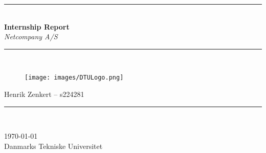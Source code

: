 \documentclass[../main.tex]{subfiles}
\begin{document}
\begin{titlepage}
	\centering
	\rule{\textwidth}{1mm}\\
	\vspace{0.1cm}
	\Huge{}\textbf{Internship Report}\\
	\LARGE{}\emph{Netcompany A/S}

	\vspace{-0.4cm}
	\rule{\textwidth}{1mm}\\
	\vspace{1.3 cm}

	\begin{figure}[H]
		\centering
    \texttt{[image: images/DTULogo.png]}
	\end{figure}

	\vspace{1.7cm}
	\mdseries
	\LARGE{  
    Henrik Zenkert                  -- s224281\\
    }
	\vspace{0.2cm}
	\rule{4cm}{0.5mm}\\
	\vspace{0.2cm}

	\large

	\today \\
	Danmarks Tekniske Universitet\\

\end{titlepage}
\end{document}
